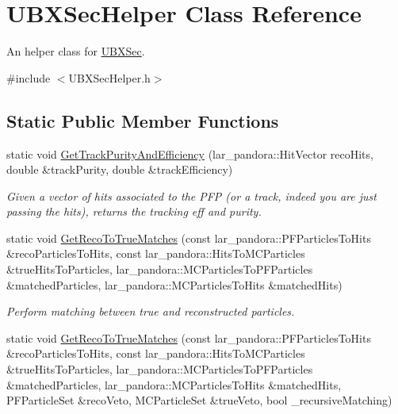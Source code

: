 \hypertarget{classUBXSecHelper}{\section{U\-B\-X\-Sec\-Helper Class Reference}
\label{classUBXSecHelper}
}


An helper class for \hyperlink{classUBXSec}{U\-B\-X\-Sec}.  




{\ttfamily \#include $<$U\-B\-X\-Sec\-Helper.\-h$>$}

\subsection*{Static Public Member Functions}
\begin{DoxyCompactItemize}
\item 
static void \hyperlink{classUBXSecHelper_a43250b48882308e09d5099186dbb1b01}{Get\-Track\-Purity\-And\-Efficiency} (lar\-\_\-pandora\-::\-Hit\-Vector reco\-Hits, double \&track\-Purity, double \&track\-Efficiency)
\begin{DoxyCompactList}\small\item\em Given a vector of hits associated to the P\-F\-P (or a track, indeed you are just passing the hits), returns the tracking eff and purity. \end{DoxyCompactList}\item 
static void \hyperlink{classUBXSecHelper_a0708dbe6fb5f3ea0f200362887473e36}{Get\-Reco\-To\-True\-Matches} (const lar\-\_\-pandora\-::\-P\-F\-Particles\-To\-Hits \&reco\-Particles\-To\-Hits, const lar\-\_\-pandora\-::\-Hits\-To\-M\-C\-Particles \&true\-Hits\-To\-Particles, lar\-\_\-pandora\-::\-M\-C\-Particles\-To\-P\-F\-Particles \&matched\-Particles, lar\-\_\-pandora\-::\-M\-C\-Particles\-To\-Hits \&matched\-Hits)
\begin{DoxyCompactList}\small\item\em Perform matching between true and reconstructed particles. \end{DoxyCompactList}\item 
static void \hyperlink{classUBXSecHelper_a111c32be3cab634ffacbfa03e7ea789b}{Get\-Reco\-To\-True\-Matches} (const lar\-\_\-pandora\-::\-P\-F\-Particles\-To\-Hits \&reco\-Particles\-To\-Hits, const lar\-\_\-pandora\-::\-Hits\-To\-M\-C\-Particles \&true\-Hits\-To\-Particles, lar\-\_\-pandora\-::\-M\-C\-Particles\-To\-P\-F\-Particles \&matched\-Particles, lar\-\_\-pandora\-::\-M\-C\-Particles\-To\-Hits \&matched\-Hits, P\-F\-Particle\-Set \&reco\-Veto, M\-C\-Particle\-Set \&true\-Veto, bool \-\_\-recursive\-Matching)

\end{DoxyCompactItemize}
